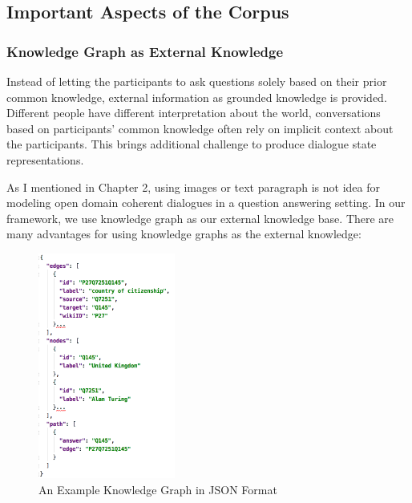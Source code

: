 \documentclass[bsc,frontabs,twoside,singlespacing,parskip,deptreport]{infthesis}     %
\begin{document}
\subsection{Important Aspects of the Corpus}
\subsubsection*{Knowledge Graph as External Knowledge}

Instead of letting the participants to ask questions solely based on their prior common knowledge, external information as grounded knowledge is provided. Different people have different interpretation about the world, conversations based on participants' common knowledge often rely on implicit context about the participants. This brings additional challenge to produce dialogue state representations.

As I mentioned in Chapter 2, using images or text paragraph is not idea for modeling open domain coherent dialogues in a question answering setting\cite{strub2017end,shekhar2017foil,reddy2019coqa,zhou2018dataset,de2017guesswhat,das2017visual,das2017learning,reddy2019coqa}. In our framework, we use knowledge graph as our external knowledge base. There are many advantages for using knowledge graphs as the external knowledge:

\begin{figure}[h]
    \centering
    \includegraphics[width=0.4\textwidth]{gkjson.png}
    \caption{An Example Knowledge Graph in JSON Format}
    \label{fig:kgjson}
\end{figure}
\end{document}
